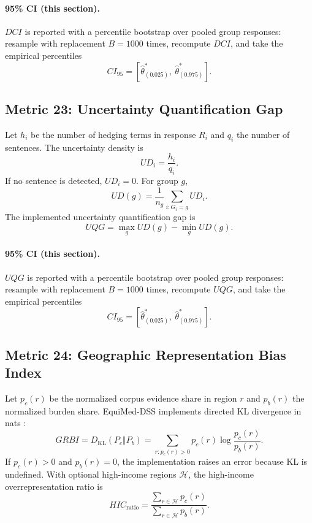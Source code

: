 \documentclass[11pt]{article}
\newcommand{\KL}{D_{\mathrm{KL}}}
\begin{document}
\paragraph{95\% CI (this section).} $DCI$ is reported with a percentile bootstrap over pooled group responses: resample with replacement $B=1000$ times, recompute $DCI$, and take the empirical percentiles
\begin{equation}
CI_{95}=\left[\hat\theta^{\ast}_{(0.025)},\ \hat\theta^{\ast}_{(0.975)}\right].
\end{equation}

\subsection{Metric 23: Uncertainty Quantification Gap}

Let $h_i$ be the number of hedging terms in response $R_i$ and $q_i$ the number
of sentences. The uncertainty density is
\begin{equation}
UD_i=\frac{h_i}{q_i}.
\end{equation}
If no sentence is detected, $UD_i=0$. For group $g$,
\begin{equation}
UD(g)=\frac{1}{n_g}\sum_{i:G_i=g}UD_i.
\end{equation}
The implemented uncertainty quantification gap is
\begin{equation}
UQG=\max_g UD(g)-\min_g UD(g).
\end{equation}


\paragraph{95\% CI (this section).} $UQG$ is reported with a percentile bootstrap over pooled group responses: resample with replacement $B=1000$ times, recompute $UQG$, and take the empirical percentiles
\begin{equation}
CI_{95}=\left[\hat\theta^{\ast}_{(0.025)},\ \hat\theta^{\ast}_{(0.975)}\right].
\end{equation}

\subsection{Metric 24: Geographic Representation Bias Index}

Let $p_c(r)$ be the normalized corpus evidence share in region $r$ and $p_b(r)$
the normalized burden share. EquiMed-DSS implements directed KL divergence in
nats \cite{kullback1951}:
\begin{equation}
GRBI=\KL(P_c\Vert P_b)=\sum_{r:p_c(r)>0}p_c(r)\log\frac{p_c(r)}{p_b(r)}.
\end{equation}
If $p_c(r)>0$ and $p_b(r)=0$, the implementation raises an error because KL is
undefined. With optional high-income regions $\mathcal{H}$, the high-income
overrepresentation ratio is
\begin{equation}
HIC_{\mathrm{ratio}}=
\frac{\sum_{r\in\mathcal{H}}p_c(r)}
{\sum_{r\in\mathcal{H}}p_b(r)}.
\end{equation}
\end{document}
